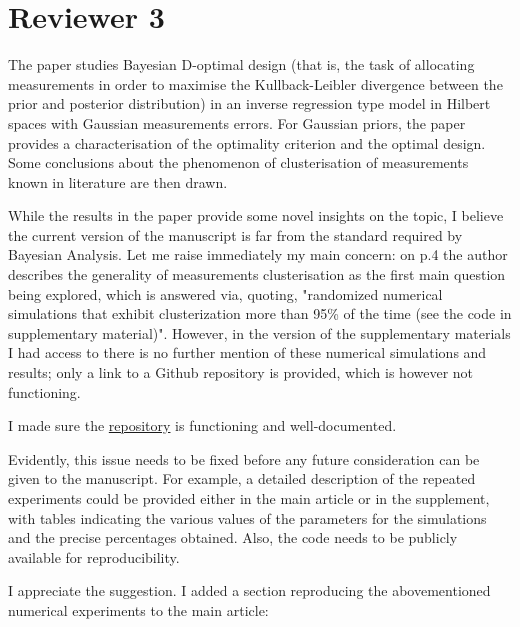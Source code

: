 \section{Reviewer 3}\label{ref3}
\RC The paper studies Bayesian D-optimal design (that is, the task of
allocating measurements in order to maximise the Kullback-Leibler
divergence between the prior and posterior distribution) in an inverse
regression type model in Hilbert spaces with Gaussian measurements
errors. For Gaussian priors, the paper provides a characterisation of
the optimality criterion and the optimal design. Some conclusions
about the phenomenon of clusterisation of measurements known in
literature are then drawn.


\RC While the results in the paper provide some novel insights on the
topic, I believe the current version of the manuscript is far from the
standard required by Bayesian Analysis. Let me raise immediately my
main concern: on p.4 the author describes the generality of
measurements clusterisation as the first main question being explored,
which is answered via, quoting, "randomized numerical simulations that
exhibit clusterization more than 95\% of the time (see the code in
supplementary material)". However, in the version of the supplementary
materials I had access to there is no further mention of these
numerical simulations and results; only a link to a Github repository
is provided, which is however not functioning.

\AR I made sure the \href{https://github.com/yairdaon/OED}{repository}
is functioning and well-documented.


\RC Evidently, this issue needs to be fixed before any future
consideration can be given to the manuscript. For example, a detailed
description of the repeated experiments could be provided either in
the main article or in the supplement, with tables indicating the
various values of the parameters for the simulations and the precise
percentages obtained. Also, the code needs to be publicly available
for reproducibility.

\AR I appreciate the suggestion. I added a section reproducing the
abovementioned numerical experiments to the main article:



